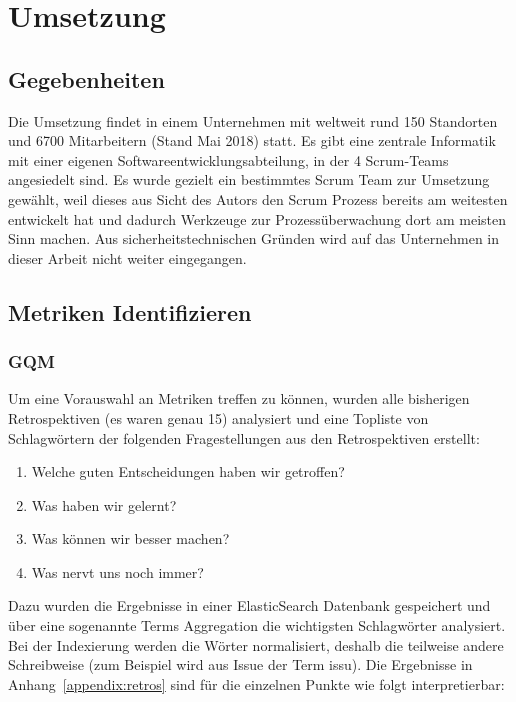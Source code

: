 \chapter{Umsetzung}

\section{Gegebenheiten}

Die Umsetzung findet in einem Unternehmen mit weltweit rund 150 Standorten und 6700 Mitarbeitern (Stand Mai 2018) statt.
Es gibt eine zentrale Informatik mit einer eigenen Softwareentwicklungsabteilung, in der 4 Scrum-Teams angesiedelt sind.
Es wurde gezielt ein bestimmtes Scrum Team zur Umsetzung gewählt, weil dieses aus Sicht des Autors den Scrum Prozess bereits am weitesten entwickelt hat und dadurch Werkzeuge zur Prozessüberwachung dort am meisten Sinn machen.
Aus sicherheitstechnischen Gründen wird auf das Unternehmen in dieser Arbeit nicht weiter eingegangen.

\newpage
\section{Metriken Identifizieren}

\subsection{\ac{GQM}}

Um eine Vorauswahl an Metriken treffen zu können, wurden alle bisherigen Retrospektiven (es waren genau 15) analysiert und eine Topliste von Schlagwörtern der folgenden Fragestellungen aus den Retrospektiven erstellt:
\begin{enumerate}
    \item Welche guten Entscheidungen haben wir getroffen?
    \item Was haben wir gelernt?
    \item Was können wir besser machen?
    \item Was nervt uns noch immer?
\end{enumerate}

Dazu wurden die Ergebnisse in einer ElasticSearch Datenbank gespeichert und über eine sogenannte Terms Aggregation die wichtigsten Schlagwörter analysiert.
Bei der Indexierung werden die Wörter normalisiert, deshalb die teilweise andere Schreibweise (zum Beispiel wird aus Issue der Term issu).
Die Ergebnisse in Anhang~\ref{appendix:retros} sind für die einzelnen Punkte wie folgt interpretierbar:

